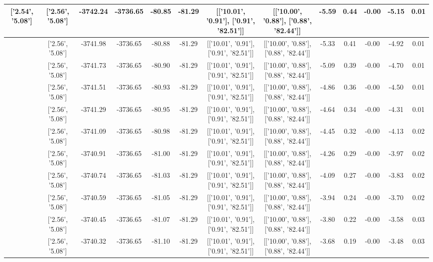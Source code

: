 \begin{table}[htbp]
\begin{adjustbox}{angle=90}
\begin{tabular}{|c|c|c|c|c|c|c|c|c|c|c|c|c|}
 ['2.54', '5.08'] & ['2.56', '5.08'] & -3742.24 & -3736.65 & -80.85 & -81.29 & [['10.01', '0.91'], ['0.91', '82.51']] & [['10.00', '0.88'], ['0.88', '82.44']] & -5.59 & 0.44 & -0.00 & -5.15 & 0.01\\ \hline
 ['2.54', '5.08'] & ['2.56', '5.08'] & -3741.98 & -3736.65 & -80.88 & -81.29 & [['10.01', '0.91'], ['0.91', '82.51']] & [['10.00', '0.88'], ['0.88', '82.44']] & -5.33 & 0.41 & -0.00 & -4.92 & 0.01\\ \hline
 ['2.54', '5.08'] & ['2.56', '5.08'] & -3741.73 & -3736.65 & -80.90 & -81.29 & [['10.01', '0.91'], ['0.91', '82.51']] & [['10.00', '0.88'], ['0.88', '82.44']] & -5.09 & 0.39 & -0.00 & -4.70 & 0.01\\ \hline
 ['2.55', '5.08'] & ['2.56', '5.08'] & -3741.51 & -3736.65 & -80.93 & -81.29 & [['10.01', '0.91'], ['0.91', '82.51']] & [['10.00', '0.88'], ['0.88', '82.44']] & -4.86 & 0.36 & -0.00 & -4.50 & 0.01\\ \hline
 ['2.55', '5.08'] & ['2.56', '5.08'] & -3741.29 & -3736.65 & -80.95 & -81.29 & [['10.01', '0.91'], ['0.91', '82.51']] & [['10.00', '0.88'], ['0.88', '82.44']] & -4.64 & 0.34 & -0.00 & -4.31 & 0.01\\ \hline
 ['2.55', '5.08'] & ['2.56', '5.08'] & -3741.09 & -3736.65 & -80.98 & -81.29 & [['10.01', '0.91'], ['0.91', '82.51']] & [['10.00', '0.88'], ['0.88', '82.44']] & -4.45 & 0.32 & -0.00 & -4.13 & 0.02\\ \hline
 ['2.55', '5.08'] & ['2.56', '5.08'] & -3740.91 & -3736.65 & -81.00 & -81.29 & [['10.01', '0.91'], ['0.91', '82.51']] & [['10.00', '0.88'], ['0.88', '82.44']] & -4.26 & 0.29 & -0.00 & -3.97 & 0.02\\ \hline
 ['2.55', '5.08'] & ['2.56', '5.08'] & -3740.74 & -3736.65 & -81.03 & -81.29 & [['10.01', '0.91'], ['0.91', '82.51']] & [['10.00', '0.88'], ['0.88', '82.44']] & -4.09 & 0.27 & -0.00 & -3.83 & 0.02\\ \hline
 ['2.55', '5.08'] & ['2.56', '5.08'] & -3740.59 & -3736.65 & -81.05 & -81.29 & [['10.01', '0.91'], ['0.91', '82.51']] & [['10.00', '0.88'], ['0.88', '82.44']] & -3.94 & 0.24 & -0.00 & -3.70 & 0.02\\ \hline
 ['2.55', '5.08'] & ['2.56', '5.08'] & -3740.45 & -3736.65 & -81.07 & -81.29 & [['10.01', '0.91'], ['0.91', '82.51']] & [['10.00', '0.88'], ['0.88', '82.44']] & -3.80 & 0.22 & -0.00 & -3.58 & 0.03\\ \hline
 ['2.55', '5.08'] & ['2.56', '5.08'] & -3740.32 & -3736.65 & -81.10 & -81.29 & [['10.01', '0.91'], ['0.91', '82.51']] & [['10.00', '0.88'], ['0.88', '82.44']] & -3.68 & 0.19 & -0.00 & -3.48 & 0.03\\ \hline

\end{tabular}
\end{adjustbox}
\end{table}
